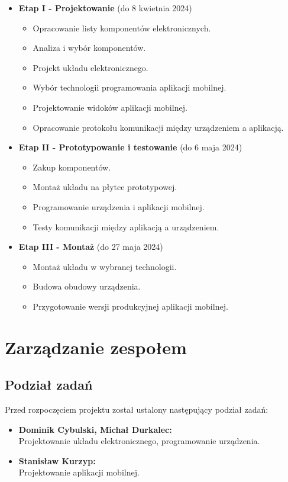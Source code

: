 \begin{itemize}
    \item \textbf{Etap I - Projektowanie} (do 8 kwietnia 2024)
          \begin{itemize}
              \item Opracowanie listy komponentów elektronicznych.
              \item Analiza i wybór komponentów.
              \item Projekt układu elektronicznego.
              \item Wybór technologii programowania aplikacji mobilnej.
              \item Projektowanie widoków aplikacji mobilnej.
              \item Opracowanie protokołu komunikacji między urządzeniem a aplikacją.
          \end{itemize}
    \item \textbf{Etap II - Prototypowanie i testowanie} (do 6 maja 2024)
          \begin{itemize}
              \item Zakup komponentów.
              \item Montaż układu na płytce prototypowej.
              \item Programowanie urządzenia i aplikacji mobilnej.
              \item Testy komunikacji między aplikacją a urządzeniem.
          \end{itemize}
    \item \textbf{Etap III - Montaż} (do 27 maja 2024)
          \begin{itemize}
              \item Montaż układu w wybranej technologii.
              \item Budowa obudowy urządzenia.
              \item Przygotowanie wersji produkcyjnej aplikacji mobilnej.
          \end{itemize}
\end{itemize}

\section{Zarządzanie zespołem}
\subsection{Podział zadań}
Przed rozpoczęciem projektu został ustalony następujący podział zadań:
\begin{itemize}
    \item \textbf{Dominik Cybulski, Michał Durkalec:} \\ Projektowanie układu elektronicznego, programowanie urządzenia.
    \item \textbf{Stanisław Kurzyp:} \\ Projektowanie aplikacji mobilnej.
\end{itemize}

